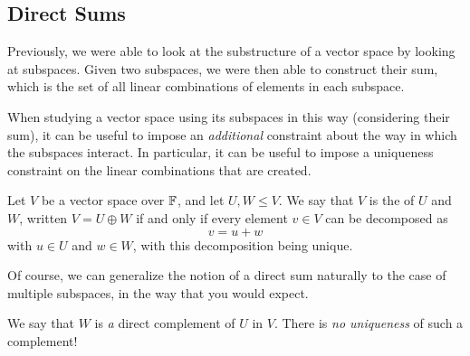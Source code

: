 \documentclass[a4paper]{scrartcl}
\begin{document}
\subsection{Direct Sums}

Previously, we were able to look at the substructure of a vector space by looking at subspaces. Given two subspaces, we were then able to construct their sum, which is the set of all linear combinations of elements in each subspace. 

When studying a vector space using its subspaces in this way (considering their sum), it can be useful to impose an \emph{additional} constraint about the way in which the subspaces interact. In particular, it can be useful to impose a uniqueness constraint on the linear combinations that are created.

\begin{definition}
    Let $V$ be a vector space over $\mathbb{F}$, and let $U, W \leq V$. We say that $V$ is the  of $U$ and $W$, written $V = U \oplus W$ if and only if every element $v \in V$ can be decomposed as
    $$
    v = u + w
    $$
    with $u \in U$ and $w \in W$, with this decomposition being unique.
\end{definition}

Of course, we can generalize the notion of a direct sum naturally to the case of multiple subspaces, in the way that you would expect.

\begin{remark}[Warning]
    We say that $W$ is \emph{a} direct complement of $U$ in $V$. There is \emph{no uniqueness} of such a complement!
\end{remark}
\end{document}
